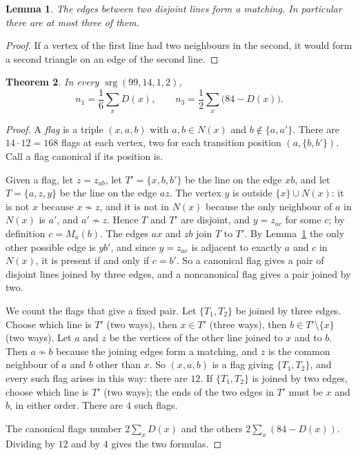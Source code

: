 \documentclass[11pt]{amsart}
\newtheorem{theorem}{Theorem}
\newtheorem{lemma}[theorem]{Lemma}
\theoremstyle{remark}
\newcommand{\srg}{\operatorname{srg}}
\begin{document}
\begin{lemma}\label{lem:matching}
The edges between two disjoint lines form a matching. In particular there are
at most three of them.
\end{lemma}

\begin{proof}
If a vertex of the first line had two neighbours in the second, it would form
a second triangle on an edge of the second line.
\end{proof}

\begin{theorem}\label{thm:flags}
In every $\srg(99,14,1,2)$,
\[
  n_1=\frac16\sum_{x}D(x),\qquad n_3=\frac12\sum_{x}\bigl(84-D(x)\bigr).
\]
\end{theorem}

\begin{proof}
A \emph{flag} is a triple $(x,a,b)$ with $a,b\in N(x)$ and
$b\notin\{a,a'\}$. There are $14\cdot12=168$ flags at each vertex, two for
each transition position $(a,\{b,b'\})$. Call a flag canonical if its position
is.

Given a flag, let $z=z_{ab}$, let $T'=\{x,b,b'\}$ be the line on the edge
$xb$, and let $T=\{a,z,y\}$ be the line on the edge $az$. The vertex $y$ is
outside $\{x\}\cup N(x)$: it is not $x$ because $x\not\sim z$, and it is not
in $N(x)$ because the only neighbour of $a$ in $N(x)$ is $a'$, and
$a'\not\sim z$. Hence $T$ and $T'$ are disjoint, and $y=z_{ac}$ for some $c$;
by definition $c=M_a(b)$. The edges $ax$ and $zb$ join $T$ to $T'$. By
Lemma~\ref{lem:matching} the only other possible edge is $yb'$, and since
$y=z_{ac}$ is adjacent to exactly $a$ and $c$ in $N(x)$, it is present if and
only if $c=b'$. So a canonical flag gives a pair of disjoint lines joined by
three edges, and a noncanonical flag gives a pair joined by two.

We count the flags that give a fixed pair. Let $\{T_1,T_2\}$ be joined by
three edges. Choose which line is $T'$ (two ways), then $x\in T'$ (three
ways), then $b\in T'\setminus\{x\}$ (two ways). Let $a$ and $z$ be the vertices
of the other line joined to $x$ and to $b$. Then $a\not\sim b$ because the
joining edges form a matching, and $z$ is the common neighbour of $a$ and $b$
other than $x$. So $(x,a,b)$ is a flag giving $\{T_1,T_2\}$, and every such
flag arises in this way: there are $12$. If $\{T_1,T_2\}$ is joined by two
edges, choose which line is $T'$ (two ways); the ends of the two edges in $T'$
must be $x$ and $b$, in either order. There are $4$ such flags.

The canonical flags number $2\sum_xD(x)$ and the others
$2\sum_x(84-D(x))$. Dividing by $12$ and by $4$ gives the two formulas.
\end{proof}
\end{document}
